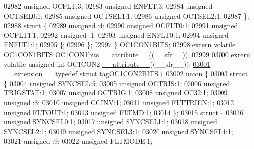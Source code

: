 \begin{DoxyCode}
02982       \textcolor{keywordtype}{unsigned} OCFLT:3;
02983       \textcolor{keywordtype}{unsigned} ENFLT:3;
02984       \textcolor{keywordtype}{unsigned} OCTSEL0:1;
02985       \textcolor{keywordtype}{unsigned} OCTSEL1:1;
02986       \textcolor{keywordtype}{unsigned} OCTSEL2:1;
02987     \};
\hypertarget{a00015_source_l02988}{}\hyperlink{a00015}{02988}     \textcolor{keyword}{struct }\{
02989       \textcolor{keywordtype}{unsigned} :4;
02990       \textcolor{keywordtype}{unsigned} OCFLT0:1;
02991       \textcolor{keywordtype}{unsigned} OCFLT1:1;
02992       \textcolor{keywordtype}{unsigned} :1;
02993       \textcolor{keywordtype}{unsigned} ENFLT0:1;
02994       \textcolor{keywordtype}{unsigned} ENFLT1:1;
02995     \};
02996   \};
02997 \} \hyperlink{a00014_d0/d8d/a00612}{OC1CON1BITS};
02998 \textcolor{keyword}{extern} \textcolor{keyword}{volatile} \hyperlink{a00014_d0/d8d/a00612}{OC1CON1BITS} OC1CON1bits \hyperlink{a00015_a493c46f03454991ccc5aa7a6e1dfb2a7}{\_\_attribute\_\_}((\_\_sfr\_\_));
02999 
03000 \textcolor{keyword}{extern} \textcolor{keyword}{volatile} \textcolor{keywordtype}{unsigned} \textcolor{keywordtype}{int}  OC1CON2 \hyperlink{a00015_a493c46f03454991ccc5aa7a6e1dfb2a7}{\_\_attribute\_\_}((\_\_sfr\_\_));
\hypertarget{a00015_source_l03001}{}\hyperlink{a00014}{03001} \_\_extension\_\_ \textcolor{keyword}{typedef} \textcolor{keyword}{struct }tagOC1CON2BITS \{
\hypertarget{a00015_source_l03002}{}\hyperlink{a00015}{03002}   \textcolor{keyword}{union }\{
\hypertarget{a00015_source_l03003}{}\hyperlink{a00015}{03003}     \textcolor{keyword}{struct }\{
03004       \textcolor{keywordtype}{unsigned} SYNCSEL:5;
03005       \textcolor{keywordtype}{unsigned} OCTRIS:1;
03006       \textcolor{keywordtype}{unsigned} TRIGSTAT:1;
03007       \textcolor{keywordtype}{unsigned} OCTRIG:1;
03008       \textcolor{keywordtype}{unsigned} OC32:1;
03009       \textcolor{keywordtype}{unsigned} :3;
03010       \textcolor{keywordtype}{unsigned} OCINV:1;
03011       \textcolor{keywordtype}{unsigned} FLTTRIEN:1;
03012       \textcolor{keywordtype}{unsigned} FLTOUT:1;
03013       \textcolor{keywordtype}{unsigned} FLTMD:1;
03014     \};
\hypertarget{a00015_source_l03015}{}\hyperlink{a00015}{03015}     \textcolor{keyword}{struct }\{
03016       \textcolor{keywordtype}{unsigned} SYNCSEL0:1;
03017       \textcolor{keywordtype}{unsigned} SYNCSEL1:1;
03018       \textcolor{keywordtype}{unsigned} SYNCSEL2:1;
03019       \textcolor{keywordtype}{unsigned} SYNCSEL3:1;
03020       \textcolor{keywordtype}{unsigned} SYNCSEL4:1;
03021       \textcolor{keywordtype}{unsigned} :9;
03022       \textcolor{keywordtype}{unsigned} FLTMODE:1;

\end{DoxyCode}

